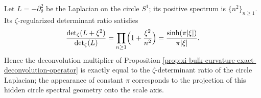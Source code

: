 \begin{remark}\label{rem:xi-bulk-curvature-circle-zeta-determinant}
Let \(L=-\partial_\theta^2\) be the Laplacian on the circle \(S^1\); its positive spectrum is \(\{n^2\}_{n\ge1}\).
Its \(\zeta\)-regularized determinant ratio satisfies
\[
\frac{\det_\zeta(L+\xi^{2})}{\det_\zeta(L)}
=\prod_{n\ge1}\Bigl(1+\frac{\xi^{2}}{n^{2}}\Bigr)
=\frac{\sinh(\pi|\xi|)}{\pi|\xi|}.
\]
Hence the deconvolution multiplier of Proposition \ref{prop:xi-bulk-curvature-exact-deconvolution-operator} is exactly equal to the \(\zeta\)-determinant ratio of the circle Laplacian;
the appearance of constant \(\pi\) corresponds to the projection of this hidden circle spectral geometry onto the scale axis.
\end{remark}

